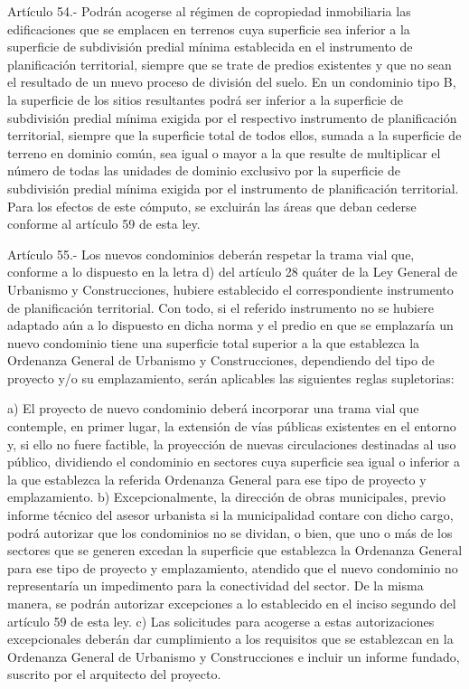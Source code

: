     Artículo 54.- Podrán acogerse al régimen de copropiedad inmobiliaria las edificaciones que se emplacen en terrenos cuya superficie sea inferior a la superficie de subdivisión predial mínima establecida en el instrumento de planificación territorial, siempre que se trate de predios existentes y que no sean el resultado de un nuevo proceso de división del suelo.
    En un condominio tipo B, la superficie de los sitios resultantes podrá ser inferior a la superficie de subdivisión predial mínima exigida por el respectivo instrumento de planificación territorial, siempre que la superficie total de todos ellos, sumada a la superficie de terreno en dominio común, sea igual o mayor a la que resulte de multiplicar el número de todas las unidades de dominio exclusivo por la superficie de subdivisión predial mínima exigida por el instrumento de planificación territorial. Para los efectos de este cómputo, se excluirán las áreas que deban cederse conforme al artículo 59 de esta ley.
     
    Artículo 55.- Los nuevos condominios deberán respetar la trama vial que, conforme a lo dispuesto en la letra d) del artículo 28 quáter de la Ley General de Urbanismo y Construcciones, hubiere establecido el correspondiente instrumento de planificación territorial.
    Con todo, si el referido instrumento no se hubiere adaptado aún a lo dispuesto en dicha norma y el predio en que se emplazaría un nuevo condominio tiene una superficie total superior a la que establezca la Ordenanza General de Urbanismo y Construcciones, dependiendo del tipo de proyecto y/o su emplazamiento, serán aplicables las siguientes reglas supletorias:
     
    a) El proyecto de nuevo condominio deberá incorporar una trama vial que contemple, en primer lugar, la extensión de vías públicas existentes en el entorno y, si ello no fuere factible, la proyección de nuevas circulaciones destinadas al uso público, dividiendo el condominio en sectores cuya superficie sea igual o inferior a la que establezca la referida Ordenanza General para ese tipo de proyecto y emplazamiento.
    b) Excepcionalmente, la dirección de obras municipales, previo informe técnico del asesor urbanista si la municipalidad contare con dicho cargo, podrá autorizar que los condominios no se dividan, o bien, que uno o más de los sectores que se generen excedan la superficie que establezca la Ordenanza General para ese tipo de proyecto y emplazamiento, atendido que el nuevo condominio no representaría un impedimento para la conectividad del sector. De la misma manera, se podrán autorizar excepciones a lo establecido en el inciso segundo del artículo 59 de esta ley.
    c) Las solicitudes para acogerse a estas autorizaciones excepcionales deberán dar cumplimiento a los requisitos que se establezcan en la Ordenanza General de Urbanismo y Construcciones e incluir un informe fundado, suscrito por el arquitecto del proyecto.
     
